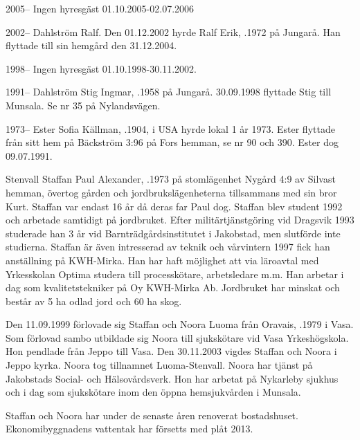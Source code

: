 2005--
Ingen hyresgäst 01.10.2005-02.07.2006

2002--
Dahlström Ralf. Den 01.12.2002 hyrde Ralf	Erik, .1972 på Jungarå. Han flyttade till sin hemgård den 31.12.2004.

1998--
Ingen hyresgäst 01.10.1998-30.11.2002.

1991--
Dahlström Stig Ingmar, .1958 på Jungarå. 30.09.1998 flyttade Stig till Munsala. Se nr 35 på Nylandsvägen.

1973--
Ester Sofia Källman, .1904, i USA hyrde lokal 1 år 1973. Ester flyttade från sitt hem på Bäckström 3:96 på Fors hemman, se nr 90 och 390. Ester dog 09.07.1991.






Stenvall Staffan Paul Alexander, .1973 på stomlägenhet Nygård 4:9 av Silvast hemman, övertog gården och jordbrukslägenheterna tillsammans med sin bror Kurt. Staffan var endast 16 år då deras far Paul dog. Staffan blev student 1992 och arbetade samtidigt på jordbruket. Efter militärtjänstgöring vid Dragsvik 1993 studerade han 3 år vid Barnträdgårdsinstitutet i Jakobstad, men slutförde inte studierna. Staffan är även intresserad av teknik och vårvintern 1997 fick han anställning på KWH-Mirka. Han har haft möjlighet att via läroavtal med Yrkesskolan Optima studera till processkötare, arbetsledare m.m.  Han arbetar i dag som kvalitetstekniker på Oy KWH-Mirka Ab. Jordbruket har minskat och består av 5 ha odlad jord och 60 ha skog.

Den 11.09.1999 förlovade sig Staffan och Noora Luoma från Oravais,	.1979 i Vasa. Som förlovad sambo utbildade sig Noora till sjukskötare vid Vasa Yrkeshögskola. Hon pendlade från Jeppo till Vasa. Den 30.11.2003 vigdes Staffan och Noora i Jeppo kyrka. Noora tog tillnamnet Luoma-Stenvall. Noora har tjänst på Jakobstads Social- och Hälsovårdsverk. Hon har arbetat på Nykarleby sjukhus och i dag som sjukskötare inom den öppna hemsjukvården i Munsala.
\begin{jhchildren}
  \item {}
  \item {}
  \item {}
\end{jhchildren}
Staffan och Noora har under de senaste åren renoverat bostadshuset. Ekonomibyggnadens vattentak har försetts med plåt 2013.


